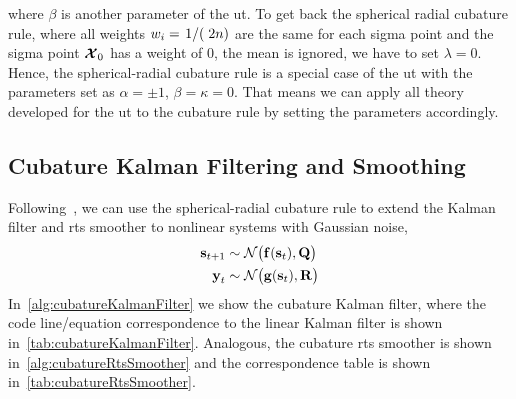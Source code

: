 		where \(\beta\) is another parameter of the \ac{ut}. To get back the spherical radial cubature rule, where all weights \( w_i = \flatfrac{1}(2n) \) are the same for each sigma point and the sigma point \( \boldsymbol{\mathrm{\mathcal{X}}}_0 \) has a weight of \(0\), \ie the mean is ignored, we have to set \( \lambda = 0 \). Hence, the spherical-radial cubature rule is a special case of the \ac{ut} with the parameters set as \( \alpha = \pm 1 \), \( \beta = \kappa = 0 \). That means we can apply all theory developed for the \ac{ut} to the cubature rule by setting the parameters accordingly.

	\subsection{Cubature Kalman Filtering and Smoothing}
		\label{subsec:cubatureFiltering}

		Following~\cite{deisenrothProbabilisticPerspectiveGaussian2011,solinCubatureIntegrationMethods2010}, we can use the spherical-radial cubature rule to extend the Kalman filter and \ac{rts} smoother to nonlinear systems with Gaussian noise, \ie
		\begin{align*}
			\boldsymbol{\mathrm{s}}_{t + 1} &\sim \mathcal{N}\big( \boldsymbol{\mathrm{f}}(\boldsymbol{\mathrm{s}}_t), \boldsymbol{\mathrm{Q}} \big) \\
			\boldsymbol{\mathrm{y}}_t &\sim \mathcal{N}\big( \boldsymbol{\mathrm{g}}(\boldsymbol{\mathrm{s}}_t), \boldsymbol{\mathrm{R}} \big)
		\end{align*}
		In~\autoref{alg:cubatureKalmanFilter} we show the cubature Kalman filter, where the code line/equation correspondence to the linear Kalman filter is shown in~\autoref{tab:cubatureKalmanFilter}. Analogous, the cubature \ac{rts} smoother is shown in~\autoref{alg:cubatureRtsSmoother} and the correspondence table is shown in~\autoref{tab:cubatureRtsSmoother}.

